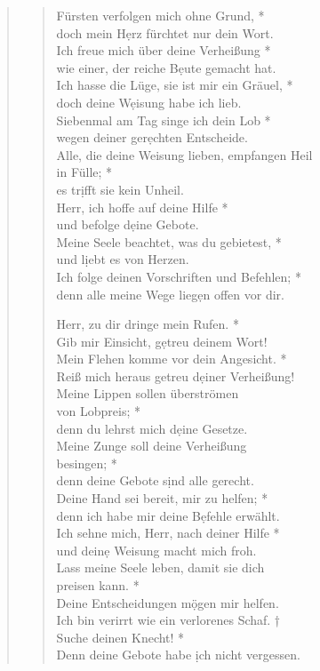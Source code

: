 \begin{quote}
\begin{verse}
Fürsten verfolgen mich ohne Grund, *\\
doch mein H\d erz fürchtet nur dein Wort.\\ \vin
Ich freue mich über deine Verheißung *\\ \vin
wie einer, der reiche B\d eute gemacht hat.\\
Ich hasse die Lüge, sie ist mir ein Gräuel, *\\
doch deine W\d eisung habe ich lieb.\\ \vin
Siebenmal am Tag singe ich dein Lob *\\ \vin
wegen deiner ger\d echten Entscheide.\\
Alle, die deine Weisung lieben, empfangen Heil\\ in Fülle; *\\
es tr\d ifft sie kein Unheil.\\ \vin
Herr, ich hoffe auf deine Hilfe *\\ \vin
und befolge d\d eine Gebote.\\ 
Meine Seele beachtet, was du gebietest, *\\
und l\d iebt es von Herzen.\\ \vin
Ich folge deinen Vorschriften und Befehlen; *\\ \vin
denn alle meine Wege lieg\d en offen vor dir.\\                         

\vspace{0.3cm}

Herr, zu dir dringe mein Rufen. *\\
Gib mir Einsicht, g\d etreu deinem Wort!\\ \vin
Mein Flehen komme vor dein Angesicht. *\\ \vin
Reiß mich heraus getreu d\d einer Verheißung!\\ 
Meine Lippen sollen überströmen\\ von Lobpreis; *\\
denn du lehrst mich d\d eine Gesetze.\\ \vin
Meine Zunge soll deine Verheißung\\ \vin  besingen; *\\ \vin
denn deine Gebote s\d ind alle gerecht.\\
Deine Hand sei bereit, mir zu helfen; *\\
denn ich habe mir deine B\d efehle erwählt.\\ \vin
Ich sehne mich, Herr, nach deiner Hilfe *\\ \vin
und dein\d e Weisung macht mich froh.\\
Lass meine Seele leben, damit sie dich \\ preisen kann. *\\
Deine Entscheidungen m\d ögen mir helfen.\\ \vin
Ich bin verirrt wie ein verlorenes Schaf. †\\ 
 \vin Suche deinen Knecht! *\\  \vin Denn deine Gebote habe \d ich nicht vergessen.\\ 
\end{verse}
\end{quote}

